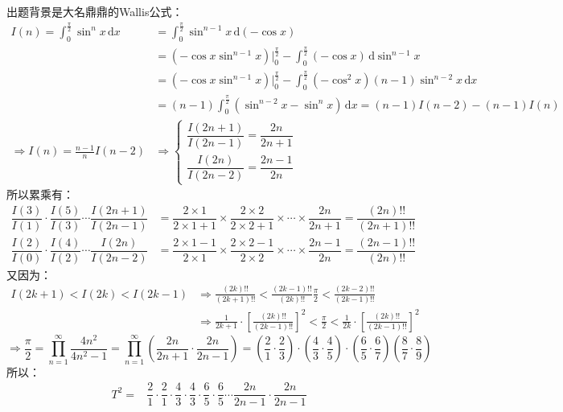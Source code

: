 \begin{solution}
    出题背景是大名鼎鼎的Wallis公式：
    \begin{align*}
I(n) = \int_0^{\frac{\pi}{2}} \sin^n x \, \mathrm{d}x 
&= \int_0^{\frac{\pi}{2}} \sin^{n-1} x \, \mathrm{d}(-\cos x) \\
&= (-\cos x \sin^{n-1} x) \rvert_{0}^{\frac{\pi}{2}} - \int_{0}^{\frac{\pi}{2}} (-\cos x) \, \mathrm{d}\sin^{n-1} x \\
&= (-\cos x \sin^{n-1} x) |_0^{\frac{\pi}{2}} - \int_0^{\frac{\pi}{2}} (-\cos^2 x) (n-1) \sin^{n-2} x \, \mathrm{d}x \\
&= (n-1) \int_0^{\frac{\pi}{2}} (\sin^{n-2} x - \sin^n x) \, \mathrm{d}x 
= (n-1) I(n-2) - (n-1) I(n) \\
\Rightarrow I(n) = \frac{n-1}{n} I(n-2) 
&\Rightarrow 
\begin{cases}
\dfrac{I(2n+1)}{I(2n-1)} = \dfrac{2n}{2n+1} \\
\dfrac{I(2n)}{I(2n-2)} = \dfrac{2n-1}{2n}
\end{cases}
\end{align*}
所以累乘有：
\begin{align*}
    \dfrac{I(3)}{I(1)} \cdot \dfrac{I(5)}{I(3)} \cdots \dfrac{I(2n+1)}{I(2n-1)} &= \dfrac{2 \times 1}{2 \times 1 + 1} \times \dfrac{2 \times 2}{2 \times 2 + 1} \times \cdots \times \dfrac{2n}{2n + 1} = \dfrac{(2n)!!}{(2n + 1)!!}\\
    \dfrac{I(2)}{I(0)} \cdot \dfrac{I(4)}{I(2)} \cdots \dfrac{I(2n)}{I(2n - 2)} &= \dfrac{2 \times 1 - 1}{2 \times 1} \times \dfrac{2 \times 2 - 1}{2 \times 2} \times \cdots \times \dfrac{2n - 1}{2n} = \dfrac{(2n - 1)!!}{(2n)!!}\end{align*}
又因为：
\begin{align*}
I(2k+1)<I(2k)<I(2k-1)&\Rightarrow \frac{(2k)!!}{(2k+1)!!}<\frac{(2k-1)!!}{(2k)!!}\frac{\pi}{2}<\frac{(2k-2)!!}{(2k-1)!!} \\&\Rightarrow \frac{1}{2k+1}\cdot[\frac{(2k)!!}{(2k-1)!!}]^{2}<\frac{\pi}{2}<\frac{1}{2k}\cdot[\frac{(2k)!!}{(2k-1)!!}]^{2}
\end{align*}\vspace{-10pt}
\[\Rightarrow \frac{\pi}{2}=\prod_{n=1}^\infty\frac{4n^2}{4n^2-1}=\prod_{n=1}^\infty(\frac{2n}{2n+1}\cdot\frac{2n}{2n-1})=(\frac{2}{1}\cdot\frac{2}{3})\cdot(\frac{4}{3}\cdot\frac{4}{5})\cdot(\frac{6}{5}\cdot\frac{6}{7})(\frac{8}{7}\cdot\frac{8}{9})\]
所以：
    \begin{align*}
        T^2=&\dfrac21\cdot\dfrac21\cdot\dfrac{4}{3}\cdot\dfrac{4}{3}\cdot\dfrac{6}{5}\cdot\dfrac{6}{5}\cdots\dfrac{2n}{2n-1}\cdot\dfrac{2n}{2n-1}

\end{align*}
\end{solution}
